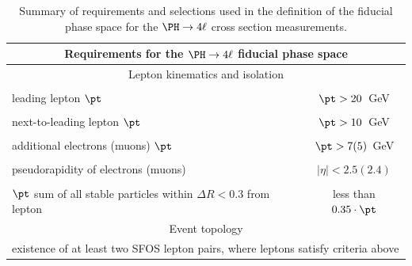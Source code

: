 \begin{table}[!h!tb]
	\begin{center}
		\small
		\caption{
			Summary of requirements and selections used in the definition of the fiducial phase space for the $\Hllll$ cross section measurements.
			\label{tab:FidDef}
		}
		\begin{tabular}{|lc|} 
			\hline %
			\hline %
			\multicolumn{2}{|c|}{\textbf{Requirements for the $\Hllll$ fiducial phase space}} \\
			\hline %
			\hline %
			\multicolumn{2}{|c|}{Lepton kinematics and isolation} \\
			\hline %
			\vspace{-0.4cm} & \\
			leading lepton $\pt$ & $\pt  > 20$~GeV \\ 
			\vspace{-0.4cm} & \\
			next-to-leading lepton $\pt$ & $\pt  > 10$~GeV \\ 
			\vspace{-0.4cm} & \\
			additional electrons (muons) $\pt$ & $\pt  > 7(5)$~GeV \\ 
			\vspace{-0.4cm} & \\
			pseudorapidity of electrons (muons) & $|\eta| < 2.5(2.4)$ \\ 
			\vspace{-0.4cm} & \\
			$\pt$ sum of all stable particles within $\Delta R < 0.3$ from lepton & less than $0.35 \cdot \pt$ \\ 
			\hline %
			\hline %
			\multicolumn{2}{|c|}{Event topology} \\
			\hline %
			\multicolumn{2}{|l|}{existence of at least two SFOS lepton pairs, where leptons satisfy criteria above} \\

\end{tabular}
\end{center}
\end{table}
